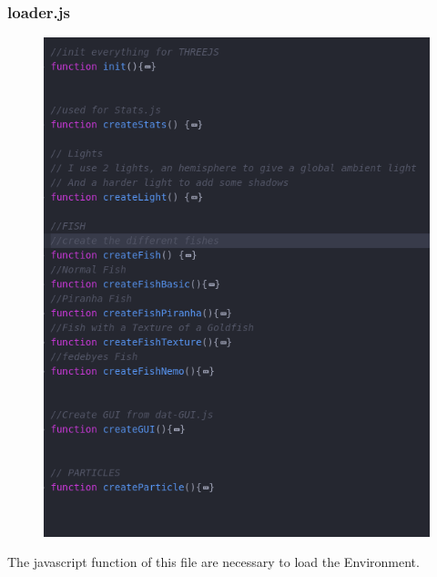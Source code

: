 \documentclass[a4paper,10pt]{article}
\begin{document}
\subsubsection{loader.js}
\begin{figure}[H]
  \includegraphics[width=\linewidth]{Screenshot_20190226_191007.png}
\end{figure}
The javascript function of this file are necessary to load the Environment.
\end{document}
